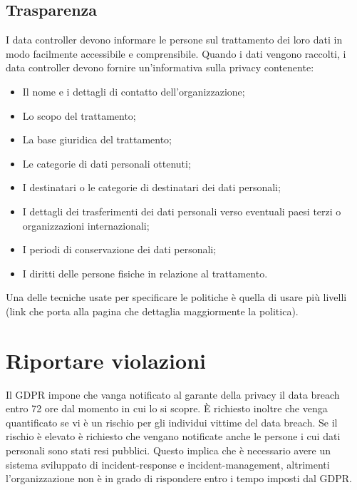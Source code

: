 \subsection{Trasparenza}
I data controller devono informare le persone sul trattamento dei loro dati in modo facilmente accessibile e comprensibile. Quando i dati vengono raccolti, i data controller devono fornire un'informativa sulla privacy contenente:
\begin{itemize}
    \item Il nome e i dettagli di contatto dell'organizzazione;
    \item Lo scopo del trattamento;
    \item La base giuridica del trattamento;
    \item Le categorie di dati personali ottenuti;
    \item I destinatari o le categorie di destinatari dei dati personali; 
    \item I dettagli dei trasferimenti dei dati personali verso eventuali paesi terzi o organizzazioni internazionali;
    \item I periodi di conservazione dei dati personali;
    \item I diritti delle persone fisiche in relazione al trattamento.
\end{itemize}

\noindent Una delle tecniche usate per specificare le politiche è quella di usare più livelli (link che porta alla pagina che dettaglia maggiormente la politica). 

\section{Riportare violazioni}
Il GDPR impone che vanga notificato al garante della privacy il data breach entro 72 ore dal momento in cui lo si scopre. È richiesto inoltre che venga quantificato se vi è un rischio per gli individui vittime del data breach. Se il rischio è elevato è richiesto che vengano notificate anche le persone i cui dati personali sono stati resi pubblici. Questo implica che è necessario avere un sistema sviluppato di incident-response e incident-management, altrimenti l'organizzazione non è in grado di rispondere entro i tempo imposti dal GDPR.

